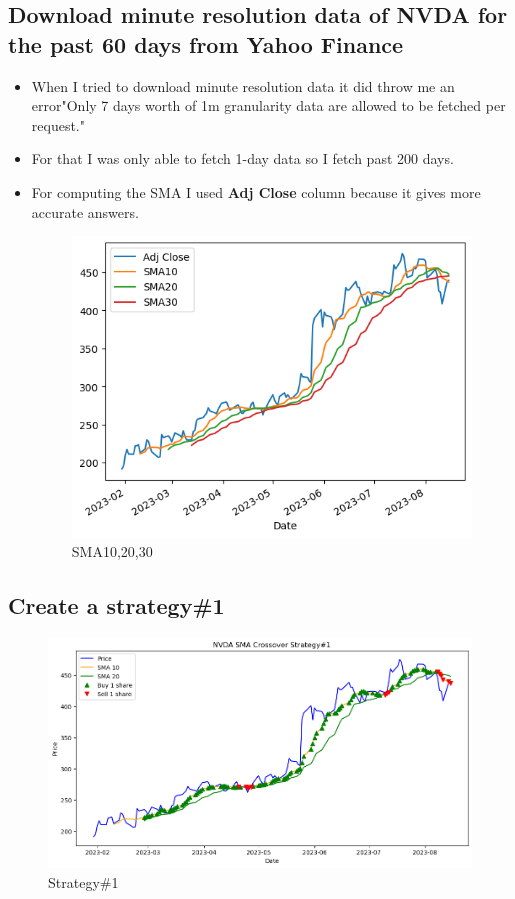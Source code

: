 \documentclass[12pt,a4paper]{article}
\begin{document}
\subsection{Download minute resolution data of NVDA for the past 60 days from Yahoo Finance}
\begin{itemize}
    \item When I tried to download minute resolution data it did throw me an error"Only 7 days worth of 1m granularity data are allowed to be fetched per request."
    \item For that I was only able to fetch 1-day data so I fetch past 200 days.
    \item For computing the SMA I used \textbf{Adj Close} column because it gives more accurate answers.
    \begin{figure}[h]
        \centering
        \includegraphics[scale=1]{Adj_SS/plot.png}
              \caption{SMA10,20,30}
    \end{figure} 
\end{itemize}
\clearpage
\subsection{Create a strategy\#1}
\begin{figure}[h]
        \centering
        \includegraphics[scale=0.50]{Adj_SS/S1.png}
              \caption{Strategy\#1}
    \end{figure} 
\end{document}
